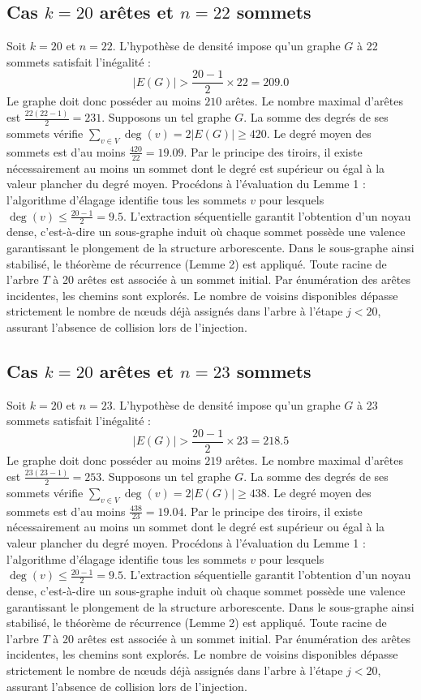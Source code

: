 \documentclass[12pt,a4paper]{article}
\begin{document}
\subsection{Cas $k = 20$ arêtes et $n = 22$ sommets}
Soit $k = 20$ et $n = 22$. L'hypothèse de densité impose qu'un graphe $G$ à 22 sommets satisfait l'inégalité :
$$ |E(G)| > \frac{20-1}{2} \times 22 = 209.0 $$
Le graphe doit donc posséder au moins $210$ arêtes. Le nombre maximal d'arêtes est $\frac{22(22-1)}{2} = 231$.
Supposons un tel graphe $G$. La somme des degrés de ses sommets vérifie $\sum_{v \in V} \deg(v) = 2|E(G)| \geq 420$.
Le degré moyen des sommets est d'au moins $\frac{420}{22} = 19.09$.
Par le principe des tiroirs, il existe nécessairement au moins un sommet dont le degré est supérieur ou égal à la valeur plancher du degré moyen.
Procédons à l'évaluation du Lemme 1 : l'algorithme d'élagage identifie tous les sommets $v$ pour lesquels $\deg(v) \leq \frac{20-1}{2} = 9.5$.
L'extraction séquentielle garantit l'obtention d'un noyau dense, c'est-à-dire un sous-graphe induit où chaque sommet possède une valence garantissant le plongement de la structure arborescente.
Dans le sous-graphe ainsi stabilisé, le théorème de récurrence (Lemme 2) est appliqué. Toute racine de l'arbre $T$ à 20 arêtes est associée à un sommet initial. Par énumération des arêtes incidentes, les chemins sont explorés. Le nombre de voisins disponibles dépasse strictement le nombre de nœuds déjà assignés dans l'arbre à l'étape $j < 20$, assurant l'absence de collision lors de l'injection.

\subsection{Cas $k = 20$ arêtes et $n = 23$ sommets}
Soit $k = 20$ et $n = 23$. L'hypothèse de densité impose qu'un graphe $G$ à 23 sommets satisfait l'inégalité :
$$ |E(G)| > \frac{20-1}{2} \times 23 = 218.5 $$
Le graphe doit donc posséder au moins $219$ arêtes. Le nombre maximal d'arêtes est $\frac{23(23-1)}{2} = 253$.
Supposons un tel graphe $G$. La somme des degrés de ses sommets vérifie $\sum_{v \in V} \deg(v) = 2|E(G)| \geq 438$.
Le degré moyen des sommets est d'au moins $\frac{438}{23} = 19.04$.
Par le principe des tiroirs, il existe nécessairement au moins un sommet dont le degré est supérieur ou égal à la valeur plancher du degré moyen.
Procédons à l'évaluation du Lemme 1 : l'algorithme d'élagage identifie tous les sommets $v$ pour lesquels $\deg(v) \leq \frac{20-1}{2} = 9.5$.
L'extraction séquentielle garantit l'obtention d'un noyau dense, c'est-à-dire un sous-graphe induit où chaque sommet possède une valence garantissant le plongement de la structure arborescente.
Dans le sous-graphe ainsi stabilisé, le théorème de récurrence (Lemme 2) est appliqué. Toute racine de l'arbre $T$ à 20 arêtes est associée à un sommet initial. Par énumération des arêtes incidentes, les chemins sont explorés. Le nombre de voisins disponibles dépasse strictement le nombre de nœuds déjà assignés dans l'arbre à l'étape $j < 20$, assurant l'absence de collision lors de l'injection.
\end{document}
